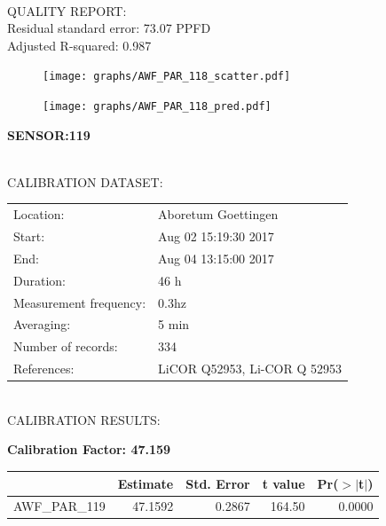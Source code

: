 \documentclass[oneside]{report}
\begin{document}
\hrulefill\\
QUALITY REPORT:\\
Residual standard error: 73.07 PPFD\\
Adjusted R-squared: 0.987



\begin{figure}[H]
  \centering
  \texttt{[image: graphs/AWF\_PAR\_118\_scatter.pdf]}
\end{figure}




\begin{figure}[H]
  \centering
  \texttt{[image: graphs/AWF\_PAR\_118\_pred.pdf]}
\end{figure}

\pagebreak


\begin{center}
\large{\textbf{SENSOR:119}}\\
\end{center}

\hrulefill\\
CALIBRATION DATASET:\\
\begin{table}[h!]
  \centering
  \label{tab:table1}
  \begin{tabular}{ll}
    Location: & Aboretum Goettingen\\ 
    
    
    Start:  & Aug 02 15:19:30 2017 \\
    End:   & Aug 04 13:15:00 2017\\ 
    Duration: & 46 h\\
    Measurement frequency: & 0.3hz\\
    Averaging:  &5 min\\
    Number of records: & 334 \\
    References: & LiCOR Q52953, Li-COR Q 52953 \\
  \end{tabular}
\end{table}

\hrulefill\\
CALIBRATION RESULTS:\\


\begin{center}
\textbf{\large{Calibration Factor: 47.159}}\\
\end{center}
\begin{table}[ht]
\centering
\begin{tabular}{rrrrr}
  \hline
 & Estimate & Std. Error & t value & Pr($>$$|$t$|$) \\ 
  \hline
AWF\_PAR\_119 & 47.1592 & 0.2867 & 164.50 & 0.0000 \\ 
   \hline
\end{tabular}
\end{table}
\end{document}
